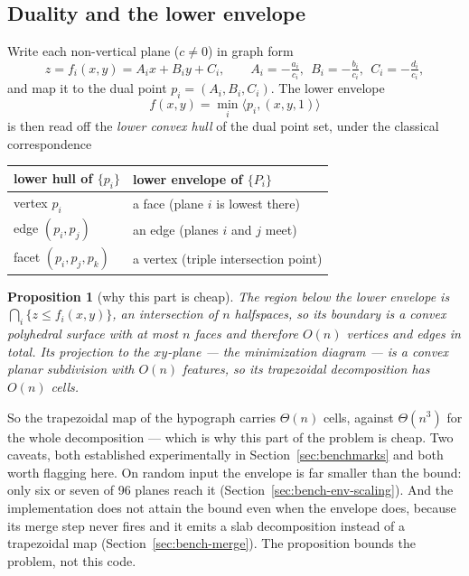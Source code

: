 \documentclass[11pt]{article}
\newtheorem{proposition}{Proposition}
\begin{document}
\subsection{Duality and the lower envelope}

Write each non-vertical plane ($c \neq 0$) in graph form
\[
  z = f_i(x,y) = A_i x + B_i y + C_i,
  \qquad A_i = -\tfrac{a_i}{c_i},\ \ B_i = -\tfrac{b_i}{c_i},\ \ C_i = -\tfrac{d_i}{c_i},
\]
and map it to the dual point $p_i = (A_i, B_i, C_i)$.  The lower envelope
\[
  f(x,y) = \min_i \langle p_i, (x, y, 1)\rangle
\]
is then read off the \emph{lower convex hull} of the dual point set, under the
classical correspondence

\begin{center}
\begin{tabular}{ll}
\toprule
lower hull of $\{p_i\}$ & lower envelope of $\{P_i\}$ \\
\midrule
vertex $p_i$            & a face (plane $i$ is lowest there) \\
edge $(p_i, p_j)$       & an edge (planes $i$ and $j$ meet) \\
facet $(p_i,p_j,p_k)$   & a vertex (triple intersection point) \\
\bottomrule
\end{tabular}
\end{center}

\begin{proposition}[why this part is cheap]
\label{prop:envelope-linear}
The region below the lower envelope is $\bigcap_i \{z \le f_i(x,y)\}$, an
intersection of $n$ halfspaces, so its boundary is a convex polyhedral surface
with at most $n$ faces and therefore $O(n)$ vertices and edges in total.  Its
projection to the $xy$-plane --- the minimization diagram --- is a convex planar
subdivision with $O(n)$ features, so its trapezoidal decomposition has $O(n)$
cells.
\end{proposition}

So the trapezoidal map of the hypograph carries $\Theta(n)$ cells, against
$\Theta(n^3)$ for the whole decomposition --- which is why this part of the
problem is cheap.  Two caveats, both established experimentally in
Section~\ref{sec:benchmarks} and both worth flagging here.  On random input the
envelope is far smaller than the bound: only six or seven of 96 planes reach it
(Section~\ref{sec:bench-env-scaling}).  And the implementation does not attain
the bound even when the envelope does, because its merge step never fires and
it emits a slab decomposition instead of a trapezoidal map
(Section~\ref{sec:bench-merge}).  The proposition bounds the problem, not this
code.
\end{document}
